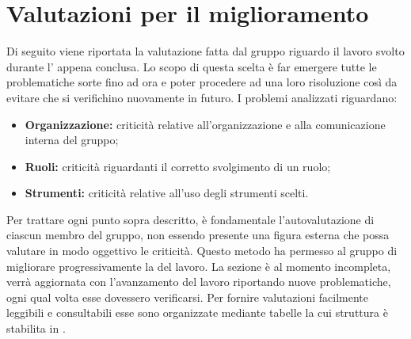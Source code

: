 \section{Valutazioni per il miglioramento}
\label{miglioramento}
Di seguito viene riportata la valutazione fatta dal gruppo {\Gruppo} riguardo il lavoro svolto durante l' appena conclusa.
Lo scopo di questa scelta è far emergere tutte le problematiche sorte fino ad ora e poter procedere ad una loro risoluzione  così da evitare che si verifichino nuovamente in futuro.
I problemi analizzati riguardano:
\begin{itemize}
	\item \textbf{Organizzazione:} criticità relative all'organizzazione e alla comunicazione interna del gruppo;
	\item \textbf{Ruoli:} criticità riguardanti il corretto svolgimento di un ruolo;
	\item \textbf{Strumenti:} criticità relative all'uso degli strumenti scelti.
\end{itemize}
Per trattare ogni punto sopra descritto, è fondamentale l'autovalutazione di ciascun membro del gruppo, non essendo presente una figura esterna che possa valutare in modo oggettivo le criticità. Questo metodo ha permesso al gruppo di migliorare progressivamente la  del lavoro. La sezione è al momento incompleta, verrà aggiornata con l’avanzamento del lavoro riportando nuove problematiche, ogni qual volta esse dovessero verificarsi. Per fornire valutazioni facilmente leggibili e consultabili esse sono organizzate mediante tabelle la cui struttura è stabilita in \textit{}.

